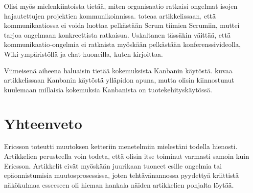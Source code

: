 \documentclass[a4paper]{article}
\begin{document}
Olisi myös mielenkiintoista tietää, miten organisaatio ratkaisi ongelmat isojen hajautettujen projektien kommunikoinnissa. \citet{mikkonen2011} toteaa artikkelissaan, että kommunikaatiossa ei voida luottaa pelkästään Scrum tiimien Scrumiin, muttei tarjoa ongelmaan konkreettista ratkaisua. Uskaltanen tässäkin väittää, että kommunikaatio-ongelmia ei ratkaista myöskään pelkästään konferenssivideolla, Wiki-ympäristöllä ja chat-huoneilla, kuten \citet{hallikainen2012} kirjoittaa.

Viimeisenä aiheena haluaisin tietää kokemuksista Kanbanin käytöstä. \citet{seikola} kuvaa artikkelissaan Kanbanin käytöstä ylläpidon apuna, mutta olisin kiinnostunut kuulemaan millaisia kokemuksia Kanbanista on tuotekehityskäytössä.

\section{Yhteenveto}

Ericsson toteutti muutoksen ketteriin menetelmiin mielestäni todella hienosti. Artikkelien perusteella voin todeta, että olisin itse toiminut varmasti samoin kuin Ericsson. Artikkelit eivät myöskään juurikaan tuoneet esille ongelmia tai epäonnistumisia muutosprosessissa, joten tehtävänannossa pyydettyä kriittistä näkökulmaa esseeseen oli hieman hankala näiden artikkelien pohjalta löytää.




\end{document}

